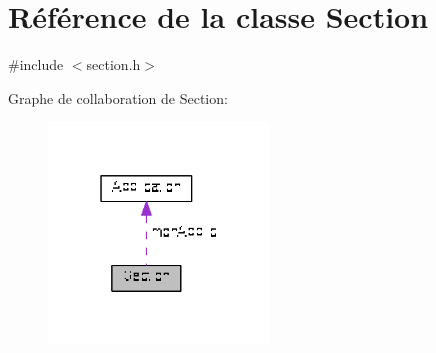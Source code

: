 \hypertarget{class_section}{\section{Référence de la classe Section}
\label{class_section}
}


{\ttfamily \#include $<$section.\+h$>$}



Graphe de collaboration de Section\+:\nopagebreak
\begin{figure}[H]
\begin{center}
\leavevmode
\includegraphics[width=166pt]{class_section__coll__graph}
\end{center}
\end{figure}
